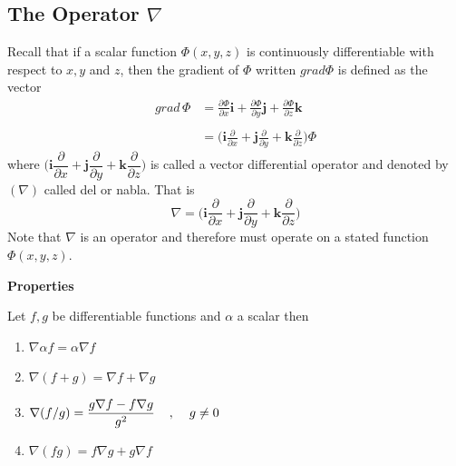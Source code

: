 \documentclass[11pt,a4paper]{article}
\theoremstyle{definition}
\newcommand{\subhead}[1]{%
  \par\medskip\noindent\textbf{#1}\par\nobreak\smallskip}
\begin{document}
{\color[wave]{485}\subsection{The Operator $\nabla$}}
Recall that if a scalar function $\Phi (x,y,z)$ is continuously differentiable with respect to $x,y$ and $z$, then the gradient of $\Phi$ written $grad \Phi$ is defined as the vector 
\begin{align*}
grad\,\Phi & = \frac{\partial \Phi}{\partial x} \textbf{i} + \frac{\partial \Phi}{\partial y}\textbf{j} + \frac{\partial \Phi}{\partial z}\textbf{k}\\\\
          & = \Bigg(\textbf{i}\frac{\partial}{\partial x} + \textbf{j} \frac{\partial}{\partial y} + \textbf{k} \frac{\partial}{\partial z}\Bigg) \Phi
\end{align*}
where $\Bigg(\textbf{i}\dfrac{\partial}{\partial x} + \textbf{j} \dfrac{\partial}{\partial y} + \textbf{k} \dfrac{\partial}{\partial z}\Bigg)$ is called a vector differential operator and denoted by $(\nabla)$ called del or nabla. That is $$\nabla = \Bigg(\textbf{i} \frac{\partial}{\partial x} + \textbf{j}\frac{\partial}{\partial y} + \textbf{k} \frac{\partial}{\partial z}\Bigg)$$ Note that $\nabla$ is an operator and therefore must operate on a stated function $\Phi (x,y,z)$.


\subhead{Properties}


Let $f, g$ be differentiable functions and $\alpha$ a scalar then
\begin{enumerate}
\item $\nabla \alpha f = \alpha \nabla f$

\item $\nabla (f + g) = \nabla f + \nabla g$

\item $ \nabla (f/g) = \dfrac{g\nabla f - f \nabla g}{g^2}\hspace{0.4cm}, \hspace{0.4cm} g\neq 0$ 

\item $\nabla (fg) = f\nabla g + g \nabla f$
\end{enumerate}
\end{document}
